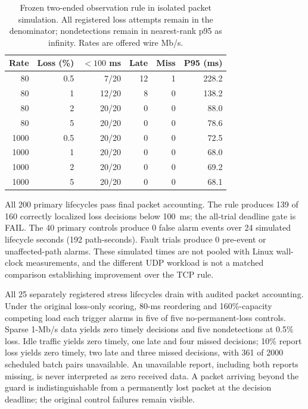 \documentclass[sigconf]{acmart}
\begin{document}
\begin{table}[t]
\caption{Frozen two-ended observation rule in isolated packet simulation.
All registered loss attempts remain in the denominator; nondetections
remain in nearest-rank p95 as infinity. Rates are offered wire Mb/s.}
\label{tab:batch-validation}
\centering
\small
\begin{tabular}{@{}rrrrrr@{}}
\toprule
Rate & Loss (\%) & $<100$ ms & Late & Miss & P95 (ms) \\
\midrule
80 & 0.5 & 7/20 & 12 & 1 & 228.2 \\
80 & 1 & 12/20 & 8 & 0 & 138.2 \\
80 & 2 & 20/20 & 0 & 0 & 88.0 \\
80 & 5 & 20/20 & 0 & 0 & 78.6 \\
1000 & 0.5 & 20/20 & 0 & 0 & 72.5 \\
1000 & 1 & 20/20 & 0 & 0 & 68.0 \\
1000 & 2 & 20/20 & 0 & 0 & 69.2 \\
1000 & 5 & 20/20 & 0 & 0 & 68.1 \\
\bottomrule
\end{tabular}
\end{table}

All 200 primary lifecycles pass final packet accounting. The rule
produces 139 of 160 correctly localized loss decisions below 100~ms;
the all-trial deadline gate is FAIL. The 40 primary controls produce
0 false alarm events over 24 simulated lifecycle seconds
(192 path-seconds). Fault trials produce 0 pre-event or
unaffected-path alarms. These simulated times are not pooled with
Linux wall-clock measurements, and the different UDP workload is
not a matched comparison establishing improvement over the TCP rule.

All 25 separately registered stress lifecycles drain with audited
packet accounting. Under the original loss-only scoring, 80-ms
reordering and 160\%-capacity competing load each trigger alarms in
five of five no-permanent-loss controls. Sparse 1-Mb/s data yields
zero timely decisions and five nondetections at 0.5\% loss. Idle
traffic yields zero timely, one late and four missed decisions;
10\% report loss yields zero timely, two late and three missed
decisions, with 361 of 2000 scheduled batch pairs unavailable.
An unavailable report, including both reports missing, is never
interpreted as zero received data. A packet arriving beyond the
guard is indistinguishable from a permanently lost packet at the
decision deadline; the original control failures remain visible.
\end{document}
